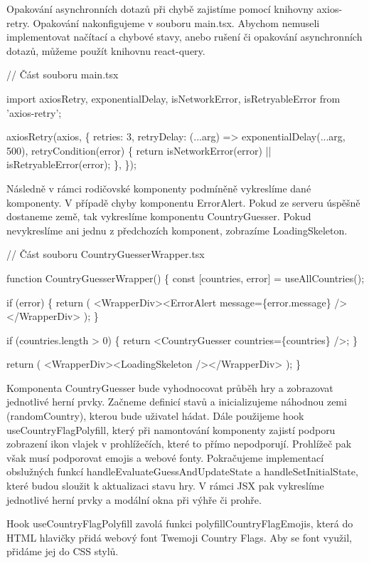 Opakování asynchronních dotazů při chybě zajistíme pomocí knihovny axios-retry. Opakování nakonfigujeme v souboru main.tsx. 
Abychom nemuseli implementovat načítací a chybové stavy, anebo rušení či opakování asynchronních dotazů, můžeme použít knihovnu react-query.

\begin{prog}
// Část souboru main.tsx

import axiosRetry, {exponentialDelay, isNetworkError, isRetryableError}
from 'axios-retry';

axiosRetry(axios, \{
  retries: 3,
  retryDelay: (...arg) => exponentialDelay(...arg, 500),
  retryCondition(error) \{
    return isNetworkError(error) || isRetryableError(error);
  \},
\});
\end{prog}

Následně v rámci rodičovské komponenty podmíněně vykreslíme dané komponenty. V případě chyby komponentu ErrorAlert. Pokud ze serveru úspěšně dostaneme země, tak vykreslíme komponentu CountryGuesser. 
Pokud nevykreslíme ani jednu z předchozích komponent, zobrazíme LoadingSkeleton.

\begin{prog}
// Část souboru CountryGuesserWrapper.tsx

function CountryGuesserWrapper() \{
  const [countries, error] = useAllCountries();

  if (error) \{
    return (
      <WrapperDiv><ErrorAlert message=\{error.message\} /></WrapperDiv>
    );
  \}

  if (countries.length > 0) \{
    return <CountryGuesser countries=\{countries\} />;
  \}

  return (
    <WrapperDiv><LoadingSkeleton /></WrapperDiv>
  );
\}
\end{prog}

Komponenta CountryGuesser bude vyhodnocovat průběh hry a zobrazovat jednotlivé herní prvky. Začneme definicí stavů a inicializujeme náhodnou zemi (randomCountry), kterou bude uživatel hádat. 
Dále použijeme hook useCountryFlagPolyfill, který při namontování komponenty zajistí podporu zobrazení ikon vlajek v prohlížečích, které to přímo nepodporují. 
Prohlížeč pak však musí podporovat emojis a webové fonty. Pokračujeme implementací obslužných funkcí handleEvaluateGuessAndUpdateState a handleSetInitialState, které budou sloužit k aktualizaci stavu hry. 
V rámci JSX pak vykreslíme jednotlivé herní prvky a modální okna při výhře či prohře.

Hook useCountryFlagPolyfill zavolá funkci polyfillCountryFlagEmojis, která do HTML hlavičky přidá webový font Twemoji Country Flags. Aby se font využil, přidáme jej do CSS stylů.

